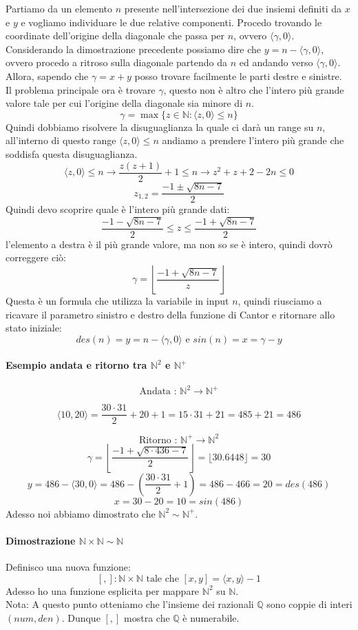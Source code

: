 \documentclass{article}
\begin{document}
Partiamo da un elemento $n$ presente nell'intersezione dei due insiemi definiti da
$x$ e $y$ e vogliamo individuare le due relative componenti. Procedo trovando
le coordinate dell'origine della diagonale che passa per $n$, ovvero $\langle\gamma ,0\rangle$.
Considerando la dimostrazione precedente possiamo dire che $y = n-\langle\gamma ,0\rangle$, ovvero
procedo a ritroso sulla diagonale partendo da $n$ ed andando verso $\langle\gamma ,0\rangle$.\\Allora,
sapendo che $\gamma=x+y$ posso trovare facilmente le parti destre e sinistre.\\ Il problema principale
ora è trovare $\gamma$, questo non è altro che l'intero più grande valore tale per cui l'origine
della diagonale sia minore di $n$.
$$\gamma = \max\{z\in\mathbb{N}:\langle z,0\rangle\leq n\}$$
Quindi dobbiamo risolvere la disuguaglianza la quale ci darà un range su $n$, all'interno di questo
range $\langle z,0\rangle\leq n$ andiamo a prendere l'intero più grande che soddisfa questa disuguaglianza.
$$\langle z,0\rangle\leq n\longrightarrow\frac{z(z+1)}{2}+1\leq n\longrightarrow z^2+z+2-2n\leq 0$$
$$z_{1,2}=\frac{-1 \pm\sqrt{8n-7}}{2}$$
Quindi devo scoprire quale è l'intero più grande dati:
$$\frac{-1 -\sqrt{8n-7}}{2}\leq z\leq \frac{-1 +\sqrt{8n-7}}{2} $$
l'elemento a destra è il più grande valore, ma non so se è intero, quindi dovrò correggere ciò:
$$\gamma=\left\lfloor\frac{-1+\sqrt{8n-7}}{z} \right\rfloor$$
Questa è un formula che utilizza la variabile in input $n$, quindi riusciamo a ricavare il parametro
sinistro e destro della funzione di Cantor e ritornare allo stato iniziale:
$$des(n)=y=n-\langle\gamma ,0\rangle \text{ e }sin(n)=x=\gamma -y$$

\paragraph{Esempio andata e ritorno tra $\mathbb{N}^2$ e $\mathbb{N}^+$}
$$\text{Andata : }\mathbb{N}^2 \longrightarrow\mathbb{N}^+$$

$$\langle 10,20\rangle = \frac{30\cdot31}{2}+20+1=15\cdot31+21=485+21=486$$

$$\text{Ritorno : }\mathbb{N}^+\longrightarrow\mathbb{N}^2$$
$$\gamma = \left\lfloor \frac{-1 + \sqrt{8 \cdot 436-7}}{2} \right\rfloor = \lfloor 30.6448\rfloor = 30$$
$$y=486- \langle 30,0\rangle = 486- \left(\frac{30\cdot31}{2}+1\right)=486-466=20=des(486)$$
$$x=30-20=10=sin(486)$$
Adesso noi abbiamo dimostrato che $\mathbb{N}^2\sim\mathbb{N}^+$.

\paragraph{Dimostrazione $\mathbb{N}\times\mathbb{N}\sim\mathbb{N}$}
Definisco una nuova funzione:
$$[,]:\mathbb{N}\times\mathbb{N}\text{ tale che }[x,y]=\langle x,y\rangle-1$$
Adesso ho una funzione esplicita per mappare $\mathbb{N}^2$ su $\mathbb{N}$.\\Nota: A questo
punto otteniamo che l'insieme dei razionali $\mathbb{Q}$ sono coppie di interi $(num,den)$. Dunque
$[,]$ mostra che $\mathbb{Q}$ è numerabile.
\end{document}
